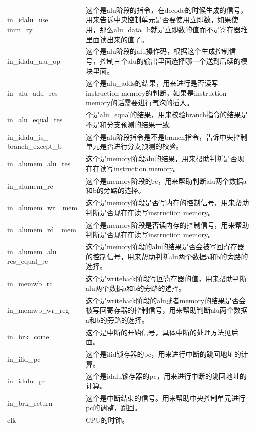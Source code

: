 \begin{center}
\begin{longtable}{p{}p{}}
            in\_idalu\_use\_ imm\_ry & 这个是alu阶段的指令，在decode的时候生成的信号，用来告诉中央控制单元是否要使用立即数，如果使用，那么alu\_data\_b就是立即数的值而不是寄存器堆里面读出来的值了。\\
            in\_idalu\_alu\_op & 这个是alu阶段的alu操作码，根据这个生成控制信号，控制三个alu的输出里面选择哪一个送到后续的模块里面。\\
            in\_alu\_add\_res & 这个是alu\_adds的结果，用来进行是否读写instruction memory的判断，如果是instruction memory的话需要进行气泡的插入。\\
            in\_alu\_equal\_res & 个是alu\_equal的结果，用来校验branch指令的结果是不是和分支预测的结果一致。\\
            in\_idalu\_is\_  branch\_except\_b & 这个是alu阶段指令是不是branch指令，告诉中央控制单元是否进行分支预测的校验。\\
            in\_alumem\_alu\_res & 这个是memory阶段alu的结果，用来帮助判断是否现在在读写instruction memory。\\ 
            in\_alumem\_rc & 这个是memory阶段的rc，用来帮助判断alu两个数据a和b的旁路的选择。\\
            in\_alumem\_wr  \_mem & 这个是memory阶段是否写内存的控制信号，用来帮助判断是否现在在读写instruction memory。\\
            in\_alumem\_rd  \_mem & 这个是memory阶段是否读内存的控制信号，用来帮助判断是否现在在读写instruction memory。\\
            in\_alumem\_alu\_  res\_equal\_rc & 这个是memory阶段的alu的结果是否会被写回寄存器的控制信号，用来帮助判断alu两个数据a和b的旁路的选择。\\
            in\_memwb\_rc & 这个是writeback阶段写回寄存器的值，用来帮助判断alu两个数据a和b的旁路的选择。\\
            in\_memwb\_wr\_reg & 这个是writeback阶段的alu或者memory的结果是否会被写回寄存器的控制信号，用来帮助判断alu两个数据a和b的旁路的选择。\\
            in\_brk\_come & 这个是中断的开始信号，具体中断的处理方法见后面。\\
            in\_ifid\_pc & 这个是ifid锁存器的pc，用来进行中断的跳回地址的计算。\\
            in\_idalu\_pc & 这个是idalu锁存器的pc，用来进行中断的跳回地址的计算。\\
            in\_brk\_return & 这个是中断结束的信号。用来帮助中央控制单元进行pc的调整，跳回。\\
            clk & CPU的时钟。\\

\end{longtable}
\end{center}
